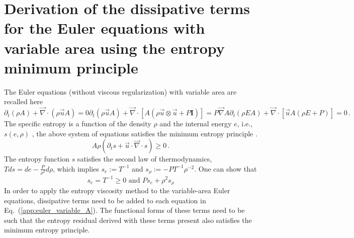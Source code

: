 \documentclass[preprint,10pt]{elsarticle}
\renewcommand{\div}{\vec{\nabla}\! \cdot \!}
\newcommand{\grad}{\vec{\nabla}}
\newcommand{\eqt}[1]{Eq.~(\ref{#1})}                     %
\begin{document}
\newpage
\section{Derivation of the dissipative terms for the Euler equations with variable area using the entropy minimum principle} \label{app:diss_terms}
%
The Euler equations (without viscous regularization) with variable area are recalled here
%
\begin{subequations}
\label{app:euler_variable_A}
%
\begin{equation}
\partial_t \left( \rho A \right) + \div \left( \rho \vec{u} A \right) = 0 
\end{equation}
%
\begin{equation}
\partial_t \left( \rho \vec{u} A \right) + \div \left[A\left( \rho \vec{u} \otimes \vec{u} + P \mathbf{I} \right) \right] = P \grad A 
\end{equation}
% 
\begin{equation}
\partial_t \left( \rho E A \right) + \div \left[ \vec{u} A \left( \rho E + P \right) \right] = 0 \,.
\end{equation}
\end{subequations}
%
The specific entropy is a function of the density $\rho$ and the internal energy $e$, i.e., $s(e,\rho)$ , the above system of equations satisfies the minimum entropy principle \cite{Leveque}.
%
\begin{equation}
A \rho \left( \partial_t s + \vec{u} \cdot \div s \right) \geq 0 \, .
\end{equation}
%
The entropy function $s$ satisfies the second law of thermodynamics, $T ds = de - \frac{P}{\rho^2} d \rho$, which implies $s_e := T^{-1}$ and $s_\rho := -P T^{-1} \rho^{-2}$. One can show that \cite{jlg}
%
\begin{equation}
s_e = T^{-1} \geq 0 \text{ and }
Ps_e + \rho^2 s_{\rho} 
\end{equation}
%
In order to apply the entropy viscosity method to the variable-area Euler equations, dissipative terms need to be added to each equation in \eqt{app:euler_variable_A}. The functional forms of these terms need to be such that the entropy residual derived with these terms present also satisfies the minimum entropy principle. 
\end{document}
